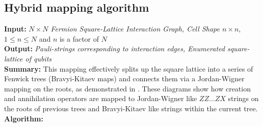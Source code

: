 \documentclass[pdftex,pra,aps,twocolumn,twoside]{revtex4-2}
\theoremstyle{plain}
\theoremstyle{note}
\newcommand\+{{\footnotesize \raisebox{0.3ex}{+}}}
\begin{document}
\subsection{Hybrid mapping algorithm}
\label{section:Hybridmapping}
\noindent
\textbf{Input:} \textit{$N\times N$ Fermion Square-Lattice Interaction Graph, Cell Shape $n \times n$}, $1\le n\le N$ and $n$ is a factor of $N$\\
\textbf{Output:} \textit{Pauli-strings corresponding to interaction edges, Enumerated square-lattice of qubits}\\
\textbf{Summary:} This mapping effectively splits up the square lattice into a series of Fenwick trees (Bravyi-Kitaev maps) and connects them via a Jordan-Wigner mapping on the roots, as demonstrated in . These diagrams show how creation and annihilation operators are mapped to Jordan-Wigner like $ZZ\ldots ZX$ strings on the roots of previous trees and Bravyi-Kitaev like strings within the current tree.\\
\textbf{Algorithm:}
\end{document}
